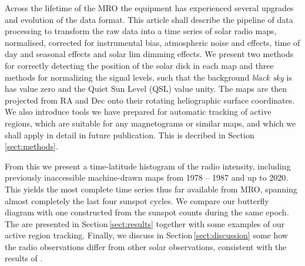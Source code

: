 \documentclass{aa}
\begin{document}
  Across the lifetime of the MRO the equipment has experienced several upgrades
  and evolution of the data format.
  This article shall describe the pipeline of data processing to transform the
  raw data into a time series of solar radio maps, normalised, corrected for
  instrumental bias, atmospheric noise and effects, time of day and seasonal
  effects and solar lim dimming effects.
  We present two methods for correctly detecting the position of the solar disk
  in each map and three methods for normalizing the signal levels, such that
  the background \emph{black sky} is has value zero and the 
  Quiet Sun Level (QSL) value unity.
  The maps are then projected from RA and Dec onto their rotating heliographic
  surface coordinates.
  We also introduce tools we have prepared for automatic tracking of active 
  regions, which are suitable for any magnetograms or similar maps, and which
  we shall apply in detail in future publication.
  This is decribed in Section\,\ref{sect:methods}.

   
  From this we present a time-latitude histogram of the radio intensity,
  including previously inaccessible machine-drawn maps from 1978 -- 1987 and
  up to 2020.
  This yields the most complete time series thus far available from MRO, 
  spanning almost completely the last four sunspot cycles.
  We compare our butterfly diagram with one constructed from the sunspot 
  counts during the same epoch.
  The are presented in Section\,\ref{sect:results} together with some 
  examples of our active region tracking.
  Finally, we discuss in Section\,\ref{sect:discussion} some how the radio 
  observations differ from other solar observations, consistent with the 
  results of \citet{Shibasaki13}. 
\end{document}
